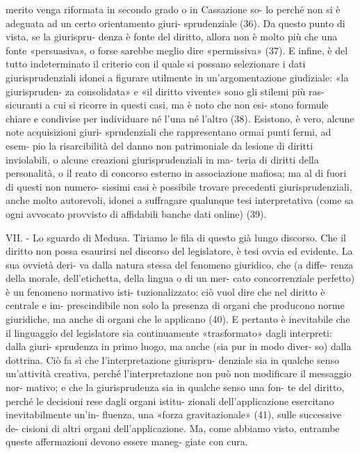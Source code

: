 merito venga riformata in secondo grado o in Cassazione so-
lo  perché  non  si  è  adeguata  ad  un  certo  orientamento  giuri-
sprudenziale  (36).  Da  questo  punto  di  vista,  se  la  giurispru-
denza è fonte del diritto, allora non è molto più che una fonte «persuasiva», o forse sarebbe meglio dire «permissiva» (37). 
E  infine,  è  del  tutto  indeterminato  il  criterio  con  il  quale  si 
possano selezionare i dati giurisprudenziali idonei a figurare 
utilmente in un’argomentazione giudiziale: «la giurispruden-
za consolidata» e «il diritto vivente» sono gli stilemi più ras-
sicuranti a cui si ricorre in questi casi, ma è noto che non esi-
stono formule chiare e condivise per individuare né l’una né 
l’altro  (38).  Esistono,  è  vero,  alcune  note  acquisizioni  giuri-
sprudenziali  che  rappresentano  ormai  punti  fermi,  ad  esem-
pio  la  risarcibilità  del  danno  non  patrimoniale  da  lesione  di 
diritti inviolabili, o alcune creazioni giurisprudenziali in ma-
teria di diritti della personalità, o il reato di concorso esterno 
in associazione mafiosa; ma al di fuori di questi non numero-
sissimi  casi  è  possibile  trovare  precedenti  giurisprudenziali, 
anche  molto  autorevoli,  idonei  a  suffragare  qualunque  tesi 
interpretativa  (come  sa  ogni  avvocato  provvisto  di  affidabili 
banche dati online) (39). 


VII. - Lo sguardo di Medusa. Tiriamo le fila di questo già 
lungo discorso. Che il diritto non possa esaurirsi nel discorso 
del legislatore, è tesi ovvia ed evidente. La sua ovvietà deri-
va  dalla  natura  stessa  del  fenomeno  giuridico,  che  (a  diffe-
renza  della  morale,  dell’etichetta,  della  lingua  o  di  un  mer-
cato  concorrenziale  perfetto)  è  un  fenomeno  normativo  isti-
tuzionalizzato:  ciò  vuol  dire  che  nel  diritto  è  centrale  e  im-
prescindibile  non  solo  la  presenza  di  organi  che  producono 
norme  giuridiche,  ma  anche  di  organi  che  le  applicano  (40). 
E  pertanto  è  inevitabile  che  il  linguaggio  del  legislatore  sia 
continuamente «trasformato» dagli interpreti: dalla giuri-
sprudenza in primo luogo, ma anche (sia pur in modo diver-
so)  dalla  dottrina.  Ciò  fa  sì  che  l’interpretazione  giurispru-
denziale  sia  in  qualche  senso  un’attività  creativa,  perché 
l’interpretazione  non  può  non  modificare  il  messaggio  nor-
mativo; e che la giurisprudenza sia in qualche senso una fon-
te  del  diritto,  perché  le  decisioni  rese  dagli  organi  istitu-
zionali  dell’applicazione esercitano inevitabilmente  un’in-
fluenza, una «forza gravitazionale» (41), sulle successive de-
cisioni  di  altri  organi  dell’applicazione.  Ma,  come  abbiamo 
visto,  entrambe  queste  affermazioni  devono  essere  maneg-
giate con cura. 


